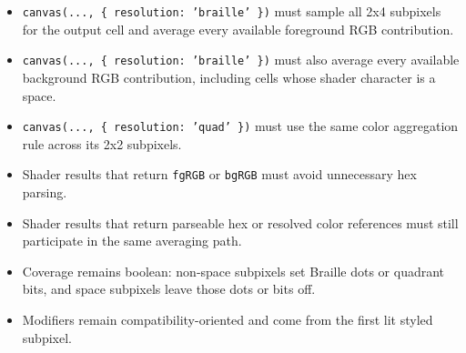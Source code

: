 \begin{itemize}
\tightlist
\item
  \texttt{c\allowbreak{}a\allowbreak{}n\allowbreak{}v\allowbreak{}a\allowbreak{}s\allowbreak{}(\allowbreak{}.\allowbreak{}.\allowbreak{}.\allowbreak{},\allowbreak{} \allowbreak{}\{\allowbreak{} \allowbreak{}r\allowbreak{}e\allowbreak{}s\allowbreak{}o\allowbreak{}l\allowbreak{}u\allowbreak{}t\allowbreak{}i\allowbreak{}o\allowbreak{}n\allowbreak{}:\allowbreak{} \allowbreak{}'\allowbreak{}b\allowbreak{}r\allowbreak{}a\allowbreak{}i\allowbreak{}l\allowbreak{}l\allowbreak{}e\allowbreak{}'\allowbreak{} \allowbreak{}\}\allowbreak{})} must sample all 2x4 subpixels for the output cell and average every available foreground RGB contribution.
\item
  \texttt{c\allowbreak{}a\allowbreak{}n\allowbreak{}v\allowbreak{}a\allowbreak{}s\allowbreak{}(\allowbreak{}.\allowbreak{}.\allowbreak{}.\allowbreak{},\allowbreak{} \allowbreak{}\{\allowbreak{} \allowbreak{}r\allowbreak{}e\allowbreak{}s\allowbreak{}o\allowbreak{}l\allowbreak{}u\allowbreak{}t\allowbreak{}i\allowbreak{}o\allowbreak{}n\allowbreak{}:\allowbreak{} \allowbreak{}'\allowbreak{}b\allowbreak{}r\allowbreak{}a\allowbreak{}i\allowbreak{}l\allowbreak{}l\allowbreak{}e\allowbreak{}'\allowbreak{} \allowbreak{}\}\allowbreak{})} must also average every available background RGB contribution, including cells whose shader character is a space.
\item
  \texttt{c\allowbreak{}a\allowbreak{}n\allowbreak{}v\allowbreak{}a\allowbreak{}s\allowbreak{}(\allowbreak{}.\allowbreak{}.\allowbreak{}.\allowbreak{},\allowbreak{} \allowbreak{}\{\allowbreak{} \allowbreak{}r\allowbreak{}e\allowbreak{}s\allowbreak{}o\allowbreak{}l\allowbreak{}u\allowbreak{}t\allowbreak{}i\allowbreak{}o\allowbreak{}n\allowbreak{}:\allowbreak{} \allowbreak{}'\allowbreak{}q\allowbreak{}u\allowbreak{}a\allowbreak{}d\allowbreak{}'\allowbreak{} \allowbreak{}\}\allowbreak{})} must use the same color aggregation rule across its 2x2 subpixels.
\item
  Shader results that return \texttt{f\allowbreak{}g\allowbreak{}R\allowbreak{}G\allowbreak{}B} or \texttt{b\allowbreak{}g\allowbreak{}R\allowbreak{}G\allowbreak{}B} must avoid unnecessary hex parsing.
\item
  Shader results that return parseable hex or resolved color references must still participate in the same averaging path.
\item
  Coverage remains boolean: non-space subpixels set Braille dots or quadrant bits, and space subpixels leave those dots or bits off.
\item
  Modifiers remain compatibility-oriented and come from the first lit styled subpixel.
\end{itemize}

